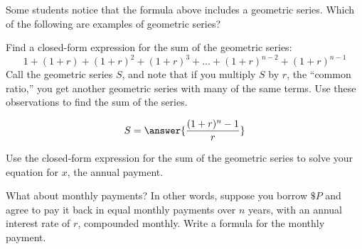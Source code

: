 \documentclass[handout,space,nooutcomes]{ximera}
\begin{document}
\newpage

\begin{question}
Some students notice that the formula above includes a geometric
series.  Which of the following are examples of geometric series?
\begin{multipleChoice}
  \choice[correct]{$0.151515151515\dots$}
\end{multipleChoice}

\end{question}




\begin{question}
Find a closed-form expression for the sum of the geometric series:
  \[
  1 + (1+r) + (1+r)^2 + (1+r)^3 + \dots + (1+r)^{n-2}+ (1+r)^{n-1}
  \]
  Call the geometric series $S$, and note that if you multiply $S$ by $r$, the ``common ratio,'' you get another geometric series with many of the same terms.  Use these observations to find the sum of the series.   

\begin{freeResponse}
\end{freeResponse}

\vfill

  \[
  S = \answer{\frac{(1+r)^n-1}{r}}
  \]
  
\end{question}

\newpage

 \begin{question}
 Use the closed-form expression for the sum of the geometric series to solve your equation for $x$, the annual payment.   
 \begin{freeResponse}
 \end{freeResponse}
 \vfill
 \end{question}

\begin{question}
What about monthly payments?  In other words, suppose you borrow $\$P$ and agree to pay it back in equal monthly
payments over $n$ years, with an annual interest rate of $r$, compounded monthly.  
Write a formula for the monthly payment.  
\begin{freeResponse}
\end{freeResponse}
\vfill
\end{question}
\end{document}
